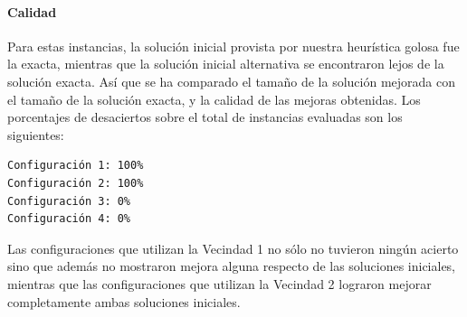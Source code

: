 \paragraph{Calidad} Para estas instancias, la solución inicial provista por nuestra heurística golosa fue la exacta, mientras que la solución inicial alternativa se encontraron lejos de la solución exacta. Así que se ha comparado el tamaño de la solución mejorada con el tamaño de la solución exacta, y la calidad de las mejoras obtenidas.  Los porcentajes de desaciertos sobre el total de instancias evaluadas son los siguientes:

\begin{verbatim}
Configuración 1: 100%
Configuración 2: 100%
Configuración 3: 0%
Configuración 4: 0%
\end{verbatim}

Las configuraciones que utilizan la Vecindad 1 no sólo no tuvieron ningún acierto sino que además no mostraron mejora alguna respecto de las soluciones iniciales, mientras que las configuraciones que utilizan la Vecindad 2 lograron mejorar completamente ambas soluciones iniciales.